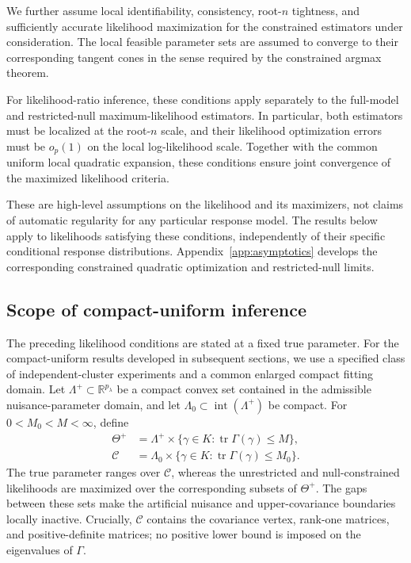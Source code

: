 We further assume local identifiability, consistency,
root-$n$ tightness, and sufficiently accurate likelihood
maximization for the constrained estimators under
consideration. The local feasible parameter sets are
assumed to converge to their corresponding tangent
cones in the sense required by the constrained argmax
theorem.

For likelihood-ratio inference, these conditions
apply separately to the full-model and restricted-null
maximum-likelihood estimators. In particular, both
estimators must be localized at the root-$n$ scale,
and their likelihood optimization errors must be
$o_p(1)$ on the local log-likelihood scale.
Together with the common uniform local quadratic
expansion, these conditions ensure joint convergence
of the maximized likelihood criteria.

These are high-level assumptions on the likelihood
and its maximizers, not claims of automatic
regularity for any particular response model.
The results below apply to likelihoods satisfying
these conditions, independently of their specific
conditional response distributions.
Appendix~\ref{app:asymptotics} develops the
corresponding constrained quadratic optimization
and restricted-null limits.

\subsection{Scope of compact-uniform inference}
\label{subsec:sec4-compact-uniform}

The preceding likelihood conditions are stated at a fixed true
parameter. For the compact-uniform results developed in subsequent
sections, we use a specified class of independent-cluster experiments
and a common enlarged compact fitting domain. Let
$\Lambda^+\subset\mathbb R^{p_\lambda}$ be a compact convex set
contained in the admissible nuisance-parameter domain, and let
$\Lambda_0\subset\operatorname{int}(\Lambda^+)$ be compact. For
$0<M_0<M<\infty$, define
\begin{equation}\label{eq:sec4-compact-classes}
\begin{aligned}
\Theta^+ & =\Lambda^+\times
 \{\gamma\in K:\operatorname{tr}\Gamma(\gamma)\leq M\},\\
\mathcal C & =\Lambda_0\times
 \{\gamma\in K:\operatorname{tr}\Gamma(\gamma)\leq M_0\}.
\end{aligned}
\end{equation}
The true parameter ranges over $\mathcal C$, whereas the unrestricted
and null-constrained likelihoods are maximized over the corresponding
subsets of $\Theta^+$. The gaps between these sets make the artificial
nuisance and upper-covariance boundaries locally inactive. Crucially,
$\mathcal C$ contains the covariance vertex, rank-one matrices, and
positive-definite matrices; no positive lower bound is imposed on the
eigenvalues of $\Gamma$.

